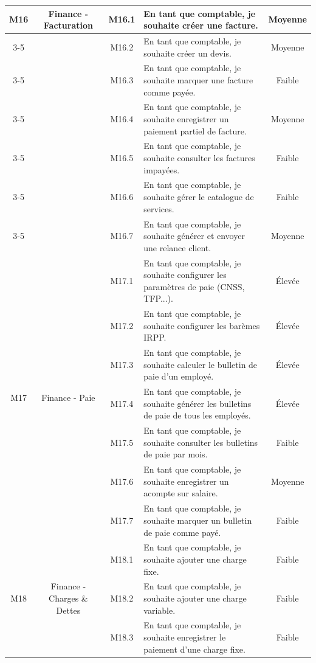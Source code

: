 \begin{longtable}{|c|c|c|p{7.2cm}|c|}
\multirow{7}{*}{M16} & \multirow{7}{*}{Finance - Facturation} & M16.1 & En tant que comptable, je souhaite créer une facture. & Moyenne \\
\cline{3-5}
 & & M16.2 & En tant que comptable, je souhaite créer un devis. & Moyenne \\
\cline{3-5}
 & & M16.3 & En tant que comptable, je souhaite marquer une facture comme payée. & Faible \\
\cline{3-5}
 & & M16.4 & En tant que comptable, je souhaite enregistrer un paiement partiel de facture. & Moyenne \\
\cline{3-5}
 & & M16.5 & En tant que comptable, je souhaite consulter les factures impayées. & Faible \\
\cline{3-5}
 & & M16.6 & En tant que comptable, je souhaite gérer le catalogue de services. & Faible \\
\cline{3-5}
 & & M16.7 & En tant que comptable, je souhaite générer et envoyer une relance client. & Moyenne \\
\hline
\multirow{7}{*}{M17} & \multirow{7}{*}{Finance - Paie} & M17.1 & En tant que comptable, je souhaite configurer les paramètres de paie (CNSS, TFP...). & Élevée \\
\cline{3-5}
 & & M17.2 & En tant que comptable, je souhaite configurer les barèmes IRPP. & Élevée \\
\cline{3-5}
 & & M17.3 & En tant que comptable, je souhaite calculer le bulletin de paie d'un employé. & Élevée \\
\cline{3-5}
 & & M17.4 & En tant que comptable, je souhaite générer les bulletins de paie de tous les employés. & Élevée \\
\cline{3-5}
 & & M17.5 & En tant que comptable, je souhaite consulter les bulletins de paie par mois. & Faible \\
\cline{3-5}
 & & M17.6 & En tant que comptable, je souhaite enregistrer un acompte sur salaire. & Moyenne \\
\cline{3-5}
 & & M17.7 & En tant que comptable, je souhaite marquer un bulletin de paie comme payé. & Faible \\
\hline
\multirow{5}{*}{M18} & \multirow{5}{*}{Finance - Charges \& Dettes} & M18.1 & En tant que comptable, je souhaite ajouter une charge fixe. & Faible \\
\cline{3-5}
 & & M18.2 & En tant que comptable, je souhaite ajouter une charge variable. & Faible \\
\cline{3-5}
 & & M18.3 & En tant que comptable, je souhaite enregistrer le paiement d'une charge fixe. & Faible \\

\end{longtable}
